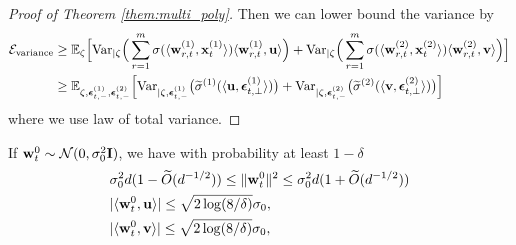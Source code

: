 \begin{proof}[Proof of Theorem \ref{them:multi_poly}]
Then we can lower bound the variance by 
\begin{align*}
    {\mathcal{E}}_{\rm variance} 
    &\geq {\mathbb{E}}_\zeta \Big[ {\rm Var}_{|\zeta} \Big(  \sum_{r=1}^m \sigma( \langle {\mathbf w}_{r,t}^{(1)}, {\mathbf{x}}_t^{(1)} \rangle  )  \langle {\mathbf w}_{r,t}^{(1)}, {\mathbf u} \rangle  \Big) + {\rm Var}_{|\zeta} \Big(  \sum_{r=1}^m \sigma( \langle {\mathbf w}_{r,t}^{(2)}, {\mathbf{x}}_t^{(2)} \rangle  )  \langle {\mathbf w}_{r,t}^{(2)}, {\mathbf v} \rangle  \Big)  \Big] \\
    &\geq {\mathbb{E}}_{\zeta, {\boldsymbol{\epsilon}}_{t,-}^{(1)}, {\boldsymbol{\epsilon}}_{t,-}^{(2)}} \Big[ {\rm Var}_{|\zeta, {\boldsymbol{\epsilon}}_{t,-}^{(1)}} \big( \widetilde \sigma^{(1)}( \langle {\mathbf u}, {\boldsymbol{\epsilon}}_{t, \perp}^{(1)} \rangle ) \big) +  {\rm Var}_{|\zeta, {\boldsymbol{\epsilon}}_{t,-}^{(2)}} \big( \widetilde \sigma^{(2)}( \langle {\mathbf v}, {\boldsymbol{\epsilon}}_{t, \perp}^{(2)} \rangle ) \big) \Big]
\end{align*}
where we use law of total variance. 
\end{proof}






\begin{lemma}
\label{lemma:init_scale}
If ${\mathbf w}_t^0 \sim {\mathcal{N}}(0, \sigma_0^2 {\mathbf{I}})$, we have with probability at least $1-\delta$
\begin{align*}
    &\sigma_0^2 d (1 - \widetilde O(d^{-1/2})) \leq \| {\mathbf w}_{t}^0 \|^2 \leq \sigma_0^2 d (1 + \widetilde O(d^{-1/2})) \\
    &|\langle {\mathbf w}_{t}^0, {\mathbf u} \rangle| \leq \sqrt{2 \log(8/\delta)} \sigma_0,  \\
     &|\langle {\mathbf w}_{t}^0, {\mathbf v} \rangle| \leq \sqrt{2 \log(8/\delta)} \sigma_0, 
\end{align*}
\end{lemma}




